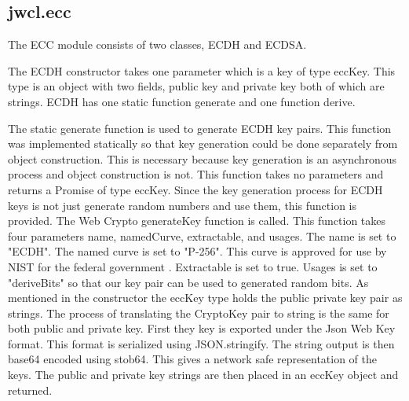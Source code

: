 \subsection{jwcl.ecc}


The ECC module consists of two classes, ECDH and ECDSA. 


The ECDH constructor takes one parameter which is a key of type eccKey. This type is an object with two fields, public key and private key both of which are strings. ECDH has one static function generate and one function derive. 


The static generate function is used to generate ECDH key pairs. This function was implemented statically so that key generation could be done separately from object construction. This is necessary because key generation is an asynchronous process and object construction is not. This function takes no parameters and returns a Promise of type eccKey. Since the key generation process for ECDH keys is not just generate random numbers and use them, this function is provided. The Web Crypto generateKey function is called. This function takes four parameters name, namedCurve, extractable, and usages. The name is set to "ECDH". The named curve is set to "P-256". This curve is approved for use by NIST for the federal government \cite{nist-curves}.
Extractable is set to true. Usages is set to "deriveBits" so that our key pair can be used to generated random bits. As mentioned in the constructor the eccKey type holds the public private key pair as strings. The process of translating the CryptoKey pair to string is the same for both public and private key. First they key is exported under the Json Web Key format. This format is serialized using JSON.stringify. The string output is then base64 encoded using stob64. This gives a network safe representation of the keys. The public and private key strings are then placed in an eccKey object and returned.



